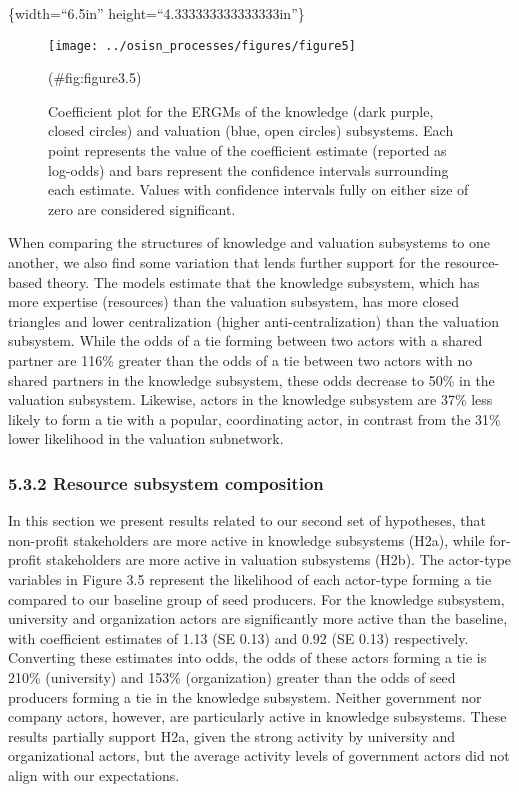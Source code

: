 \documentclass[twoside,12pt,final]{ucthesis-CA2012}
\begin{document}
\begin{ucmainmatter}
\{width=``6.5in'' height=``4.333333333333333in''\}
\begin{figure}

{\centering \texttt{[image: ../osisn\_processes/figures/figure5]} 

}

\caption{Coefficient plot for the ERGMs of the knowledge (dark purple, closed circles) and valuation (blue, open circles) subsystems. Each point represents the value of the coefficient estimate (reported as log-odds) and bars represent the confidence intervals surrounding each estimate. Values with confidence intervals fully on either size of zero are considered significant.}(\#fig:figure3.5)
\end{figure}
When comparing the structures of knowledge and valuation subsystems to
one another, we also find some variation that lends further support for
the resource-based theory. The models estimate that the knowledge
subsystem, which has more expertise (resources) than the valuation
subsystem, has more closed triangles and lower centralization (higher
anti-centralization) than the valuation subsystem. While the odds of a
tie forming between two actors with a shared partner are 116\% greater
than the odds of a tie between two actors with no shared partners in the
knowledge subsystem, these odds decrease to 50\% in the valuation
subsystem. Likewise, actors in the knowledge subsystem are 37\% less
likely to form a tie with a popular, coordinating actor, in contrast
from the 31\% lower likelihood in the valuation subnetwork.

\hypertarget{resource-subsystem-composition}{%
\subsubsection{5.3.2 Resource subsystem composition}\label{resource-subsystem-composition}}

In this section we present results related to our second set of
hypotheses, that non-profit stakeholders are more active in knowledge
subsystems (H2a), while for-profit stakeholders are more active in
valuation subsystems (H2b). The \textquotesingle actor-type\textquotesingle{} variables in Figure 3.5
represent the likelihood of each actor-type forming a tie compared to
our baseline group of seed producers. For the knowledge subsystem,
university and organization actors are significantly more active than
the baseline, with coefficient estimates of 1.13 (SE 0.13) and 0.92 (SE
0.13) respectively. Converting these estimates into odds, the odds of
these actors\textquotesingle{} forming a tie is 210\% (university) and 153\%
(organization) greater than the odds of seed producers forming a tie in
the knowledge subsystem. Neither government nor company actors, however,
are particularly active in knowledge subsystems. These results partially
support H2a, given the strong activity by university and organizational
actors, but the average activity levels of government actors did not
align with our expectations.


\end{ucmainmatter}
\end{document}
